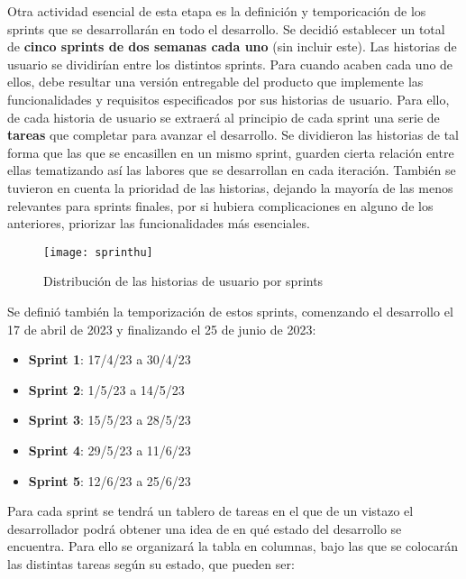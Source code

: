 Otra actividad esencial de esta etapa es la definición y temporicación de los sprints que se desarrollarán en todo el desarrollo. Se decidió establecer un total de \textbf{cinco sprints de dos semanas cada uno} (sin incluir este). Las historias de usuario se dividirían entre los distintos sprints. Para cuando acaben cada uno de ellos, debe resultar una versión entregable del producto que implemente las funcionalidades y requisitos especificados por sus historias de usuario. Para ello, de cada historia de usuario se extraerá al principio de cada sprint una serie de \textbf{tareas} que completar para avanzar el desarrollo. Se dividieron las historias de tal forma que las que se encasillen en un mismo sprint, guarden cierta relación entre ellas tematizando así las labores que se desarrollan en cada iteración. También se tuvieron en cuenta la prioridad de las historias, dejando la mayoría de las menos relevantes para sprints finales, por si hubiera complicaciones en alguno de los anteriores, priorizar las funcionalidades más esenciales.

\begin{figure}[h]
    \centering
    \texttt{[image: sprinthu]}
    \caption[Planificación de HU por sprints]{Distribución de las historias de usuario por sprints}
\end{figure}

Se definió también la temporización de estos sprints, comenzando el desarrollo el 17 de abril de 2023 y finalizando el 25 de junio de 2023:
\begin{itemize}
    \item \textbf{Sprint 1}: 17/4/23 a 30/4/23
    \item \textbf{Sprint 2}: 1/5/23 a 14/5/23
    \item \textbf{Sprint 3}: 15/5/23 a 28/5/23
    \item \textbf{Sprint 4}: 29/5/23 a 11/6/23
    \item \textbf{Sprint 5}: 12/6/23 a 25/6/23
\end{itemize}

Para cada sprint se tendrá un tablero de tareas en el que de un vistazo el desarrollador podrá obtener una idea de en qué estado del desarrollo se encuentra. Para ello se organizará la tabla en columnas, bajo las que se colocarán las distintas tareas según su estado, que pueden ser:

